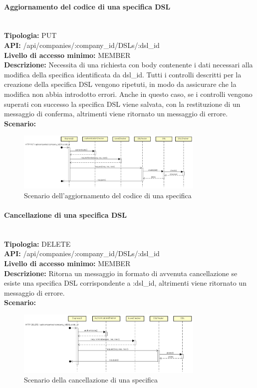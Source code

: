 \paragraph{Aggiornamento del codice di una specifica DSL}\mbox{}\\
\textbf{Tipologia:} PUT \\
\textbf{API:} /api/companies/:company\_id/DSLs/:dsl\_id \\
\textbf{Livello di accesso minimo:} MEMBER \\
\textbf{Descrizione:} Necessita di una richiesta con body contenente i dati necessari alla modifica della specifica  identificata da dsl\_id. Tutti i controlli descritti per la creazione della specifica DSL vengono ripetuti, in modo da assicurare che la modifica non abbia introdotto errori. Anche in questo caso, se i controlli vengono superati con successo la specifica DSL viene salvata, con la restituzione di un messaggio di conferma, altrimenti viene ritornato un messaggio di errore. \\
\textbf{Scenario:}
\begin{figure}[H]
\centering
\includegraphics[width=0.8\textwidth]{res/sections/backend/sequence/(PUT)dsl.png}
\caption{Scenario dell'aggiornamento del codice di una specifica }
\end{figure}

\newpage
\paragraph{Cancellazione di una specifica DSL}\mbox{}\\
\textbf{Tipologia:} DELETE \\
\textbf{API:} /api/companies/:company\_id/DSLs/:dsl\_id \\
\textbf{Livello di accesso minimo:} MEMBER \\
\textbf{Descrizione:} Ritorna un messaggio in formato  di avvenuta cancellazione se esiste una specifica DSL corrispondente a :dsl\_id, altrimenti viene ritornato un messaggio di errore. \\
\textbf{Scenario:} 
\begin{figure}[H]
\centering
\includegraphics[width=0.8\textwidth]{res/sections/backend/sequence/(DELETE)dsl.png}
\caption{Scenario della cancellazione di una specifica }
\end{figure}


